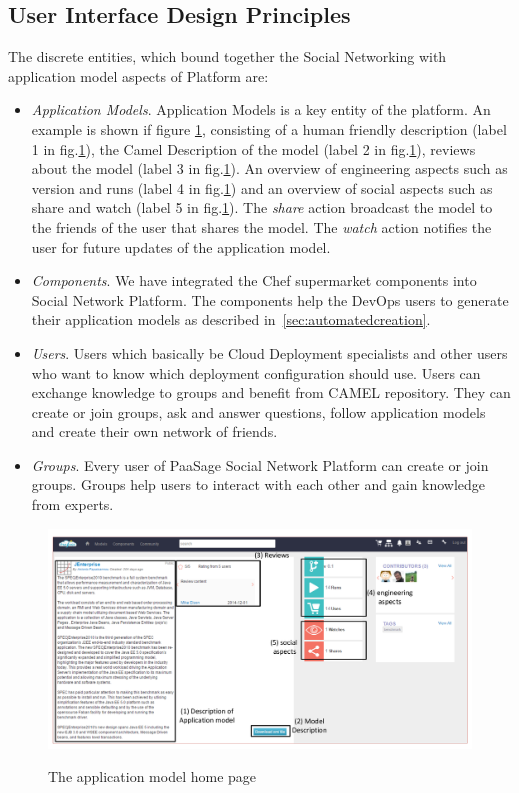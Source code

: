 \subsection{User Interface Design Principles}
The discrete entities, which bound together the Social Networking with application model aspects of Platform are:
\begin{itemize}
\item \emph{Application Models}. Application Models is a key entity of the platform. An example is shown if figure \ref{fig:jenter_home}, consisting of a human friendly description (label 1 in fig.\ref{fig:jenter_home}), the Camel Description of the model (label 2 in fig.\ref{fig:jenter_home}), reviews about the model (label 3 in fig.\ref{fig:jenter_home}). An overview of engineering aspects such as version and runs (label 4 in fig.\ref{fig:jenter_home}) and an overview of social aspects such as share and watch (label 5 in fig.\ref{fig:jenter_home}). The {\it share} action broadcast the model to the friends of the user that shares the model. The {\it watch} action notifies the user for future updates of the application model. 
\item \emph{Components}. We have integrated the Chef supermarket components into Social Network Platform. The components help the DevOps users to generate their application models as described in~\ref{sec:automatedcreation}. 
\item \emph{Users}. Users which basically be Cloud Deployment specialists and other users who want to know which deployment configuration should use. Users can exchange knowledge to groups and benefit from CAMEL repository. They can create or join groups, ask and answer questions, follow application models and create their own network of friends.
\item \emph{Groups}. Every user of PaaSage Social Network Platform can create or join groups. Groups help users to interact with each other and gain knowledge from experts.
\end{itemize}

\begin{figure}[h]
	\caption{The application model home page}
	\includegraphics[width=1\textwidth,natwidth=200,natheight=150]{./fig/jenterprise_home_page.pdf}
	\centering
	\label{fig:jenter_home}
\end{figure}

